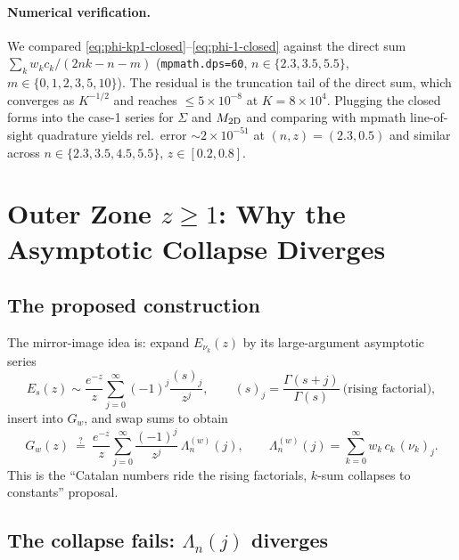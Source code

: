 \documentclass{article}
\begin{document}
\paragraph{Numerical verification.}
We compared \eqref{eq:phi-kp1-closed}--\eqref{eq:phi-1-closed} against the
direct sum $\sum_k w_k c_k/(2nk-n-m)$ (\texttt{mpmath.dps=60},
$n\in\{2.3,3.5,5.5\}$, $m\in\{0,1,2,3,5,10\}$).  The residual is the truncation
tail of the direct sum, which converges as $K^{-1/2}$ and reaches $\le 5\times
10^{-8}$ at $K=8\times10^4$.  Plugging the closed forms into the case-1
series for $\Sigma$ and $M_{\rm 2D}$ and comparing with mpmath line-of-sight
quadrature yields rel.\ error $\sim2\times10^{-51}$ at $(n,z)=(2.3,0.5)$ and
similar across $n\in\{2.3,3.5,4.5,5.5\}$, $z\in[0.2,0.8]$.

\fussy
\section{Outer Zone \texorpdfstring{$z\ge1$}{z>=1}: Why the Asymptotic Collapse Diverges}
\label{sec:outer}

\subsection{The proposed construction}

The mirror-image idea is: expand $E_{\nu_k}(z)$ by its large-argument
asymptotic series
\begin{equation}\label{eq:Es-large}
E_{s}(z)\sim\frac{e^{-z}}{z}
   \sum_{j=0}^{\infty}(-1)^j\frac{(s)_j}{z^{j}},
\qquad (s)_j=\frac{\Gamma(s+j)}{\Gamma(s)}\ \text{(rising factorial)},
\end{equation}
insert into $G_w$, and swap sums to obtain
\begin{equation}\label{eq:outer-attempt}
G_w(z)\ \overset{?}{=}\ \frac{e^{-z}}{z}\sum_{j=0}^{\infty}
   \frac{(-1)^j}{z^{j}}\,\Lambda^{(w)}_n(j),
\qquad
\Lambda^{(w)}_n(j)=\sum_{k=0}^{\infty}w_k\,c_k\,(\nu_k)_j .
\end{equation}
This is the ``Catalan numbers ride the rising factorials, $k$-sum collapses to
constants'' proposal.

\subsection{The collapse fails: \texorpdfstring{$\Lambda_n(j)$}{Lambda\_n(j)} diverges}
\end{document}
